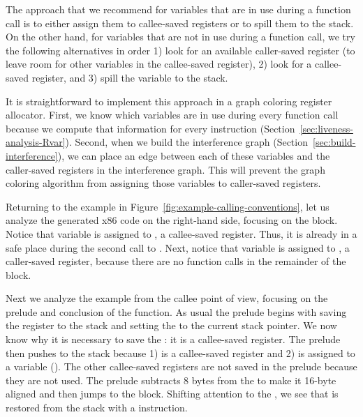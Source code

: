 \documentclass[11pt]{book}
\begin{document}
The approach that we recommend for variables that are in use during a
function call is to either assign them to callee-saved registers or to
spill them to the stack. On the other hand, for variables that are not
in use during a function call, we try the following alternatives in
order 1) look for an available caller-saved register (to leave room
for other variables in the callee-saved register), 2) look for a
callee-saved register, and 3) spill the variable to the stack.

It is straightforward to implement this approach in a graph coloring
register allocator. First, we know which variables are in use during
every function call because we compute that information for every
instruction (Section~\ref{sec:liveness-analysis-Rvar}). Second, when we
build the interference graph (Section~\ref{sec:build-interference}),
we can place an edge between each of these variables and the
caller-saved registers in the interference graph. This will prevent
the graph coloring algorithm from assigning those variables to
caller-saved registers.

Returning to the example in
Figure~\ref{fig:example-calling-conventions}, let us analyze the
generated x86 code on the right-hand side, focusing on the
 block. Notice that variable  is assigned to
, a callee-saved register. Thus, it is already in a safe
place during the second call to . Next, notice that
variable  is assigned to , a caller-saved register,
because there are no function calls in the remainder of the block.

Next we analyze the example from the callee point of view, focusing on
the prelude and conclusion of the  function. As usual the
prelude begins with saving the  register to the stack and
setting the  to the current stack pointer. We now know why
it is necessary to save the : it is a callee-saved register.
The prelude then pushes  to the stack because 1) 
is a callee-saved register and 2)  is assigned to a variable
(). The other callee-saved registers are not saved in the
prelude because they are not used. The prelude subtracts 8 bytes from
the  to make it 16-byte aligned and then jumps to the
 block. Shifting attention to the , we
see that  is restored from the stack with a 
instruction.  
\end{document}
